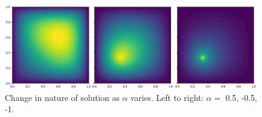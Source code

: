 \documentclass[letterpaper,10pt]{article}
\begin{document}
\begin{figure}[!htb]
\centering
\includegraphics[width=1 \linewidth]{comp.PNG}
\caption{Change in nature of solution as $\alpha$ varies. Left to right: $\alpha =$ 0.5, -0.5, -1.}
\end{figure}
\end{document}
